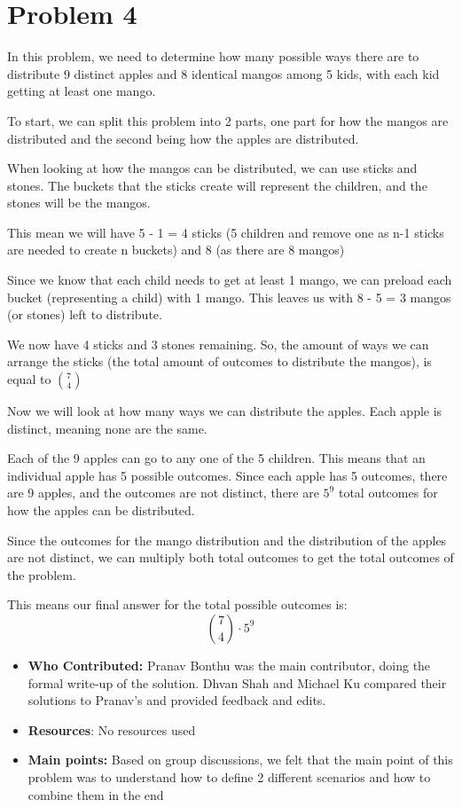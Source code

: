 \documentclass[11pt]{article}
\begin{document}
\section*{Problem 4}

In this problem, we need to determine how many possible ways there are to distribute 9 distinct apples and 8 identical mangos among 5 kids, with each kid getting at least one mango.

To start, we can split this problem into 2 parts, one part for how the mangos are distributed and the second being how the apples are distributed.

When looking at how the mangos can be distributed, we can use sticks and stones. The buckets that the sticks create will represent the children, and the stones will be the mangos.

This mean we will have 5 - 1 = 4 sticks (5 children and remove one as n-1 sticks are needed to create n buckets) and 8 (as there are 8 mangos)

Since we know that each child needs to get at least 1 mango, we can preload each bucket (representing a child) with 1 mango. This leaves us with 8 - 5 = 3 mangos (or stones) left to distribute.

We now have 4 sticks and 3 stones remaining. So, the amount of ways we can arrange the sticks (the total amount of outcomes to distribute the mangos), is equal to  $\binom{7}{4}$

Now we will look at how many ways we can distribute the apples. Each apple is distinct, meaning none are the same.

Each of the 9 apples can go to any one of the 5 children. This means that an individual apple has 5 possible outcomes. Since each apple has 5 outcomes, there are 9 apples, and the outcomes are not distinct, there are $5^9$ total outcomes for how the apples can be distributed.

Since the outcomes for the mango distribution and the distribution of the apples are not distinct, we can multiply both total outcomes to get the total outcomes of the problem. 

This means our final answer for the total possible outcomes is:  $$\binom{7}{4} \cdot  5^9$$


\begin{itemize}
    \item \textbf{Who Contributed:} Pranav Bonthu was the main contributor, doing the formal write-up of the solution. Dhvan Shah and Michael Ku compared their solutions to Pranav's and provided feedback and edits.
    \item \textbf{Resources}: No resources used
    \item \textbf{Main points:} Based on group discussions, we felt that the main point of this problem was to understand how to define 2 different scenarios and how to combine them in the end
\end{itemize}
\end{document}
